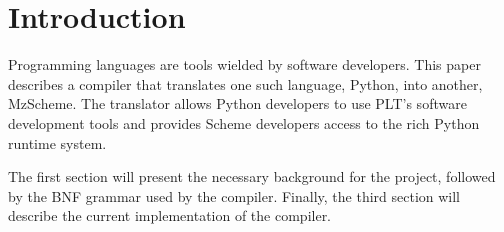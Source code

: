 
\section{Introduction}


Programming languages are tools wielded by software developers.  This paper describes a compiler that translates one such language, Python, into another, MzScheme.  The translator allows Python developers to use PLT's software development tools and provides Scheme developers access to the rich Python runtime system.

  The first section will present the necessary background for the project, followed by the BNF grammar used by the compiler.  Finally, the third section will describe the current implementation of the compiler.
